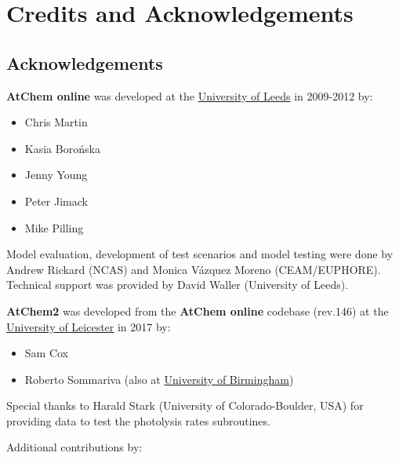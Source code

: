 %
%
%
%

\chapter{Credits and Acknowledgements} \label{ch:credits}

\section{Acknowledgements} \label{sec:acknowledgements}

\textbf{AtChem online} was developed at the
\href{https://www.leeds.ac.uk}{University of Leeds} in 2009-2012 by:

\begin{itemize}
\item Chris Martin
\item Kasia Boro{\'n}ska
\item Jenny Young
\item Peter Jimack
\item Mike Pilling
\end{itemize}

Model evaluation, development of test scenarios and model testing were
done by Andrew Rickard (NCAS) and Monica V{\'a}zquez Moreno (CEAM/EUPHORE).
Technical support was provided by David Waller (University of Leeds).

\textbf{AtChem2} was developed from the \textbf{AtChem online}
codebase (rev.146) at the \href{https://le.ac.uk}{University of
  Leicester} in 2017 by:

\begin{itemize}
\item Sam Cox
\item Roberto Sommariva (also at \href{https://www.birmingham.ac.uk}{University of Birmingham})
\end{itemize}

Special thanks to Harald Stark (University of Colorado-Boulder, USA)
for providing data to test the photolysis rates subroutines.

Additional contributions by:

